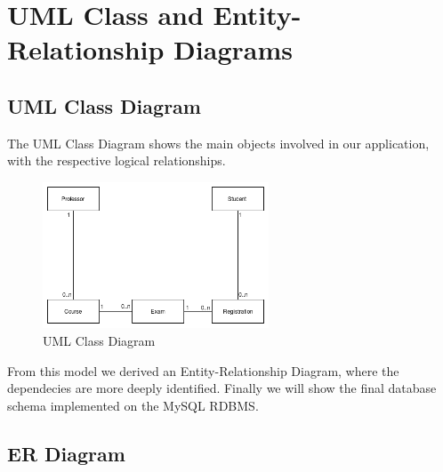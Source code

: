 \documentclass{report}
\begin{document}
\chapter*{UML Class and Entity-Relationship Diagrams}
\section*{UML Class Diagram} 
The UML Class Diagram shows the main objects involved in our application, with the respective logical relationships.
\begin{figure}[ht]
	\includegraphics[width=0.6\textwidth]{ClassDiagram.png}
	\caption{UML Class Diagram}
\end{figure} 
From this model we derived an Entity-Relationship Diagram, where the dependecies are more deeply identified. Finally we will show the final database schema implemented on the MySQL RDBMS.
\section*{ER Diagram}
\end{document}
